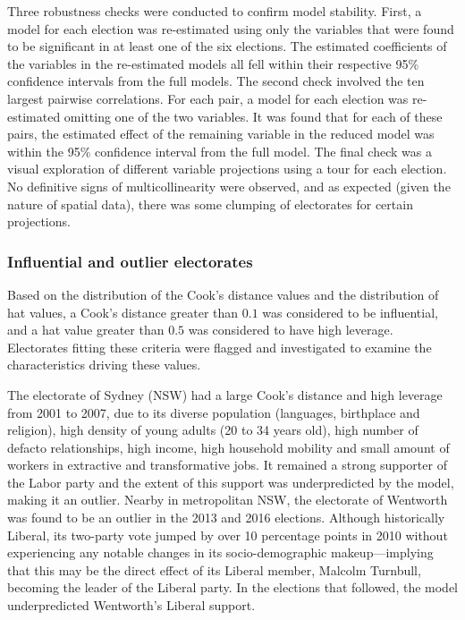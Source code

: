 \documentclass[
  times, doublespace]{anzsauth}
\begin{document}
Three robustness checks were conducted to confirm model stability. First, a model for each election was re-estimated using only the variables that were found to be significant in at least one of the six elections. The estimated coefficients of the variables in the re-estimated models all fell within their respective 95\% confidence intervals from the full models. The second check involved the ten largest pairwise correlations. For each pair, a model for each election was re-estimated omitting one of the two variables. It was found that for each of these pairs, the estimated effect of the remaining variable in the reduced model was within the 95\% confidence interval from the full model. The final check was a visual exploration of different variable projections using a tour \citep{tourr} for each election. No definitive signs of multicollinearity were observed, and as expected (given the nature of spatial data), there was some clumping of electorates for certain projections.

\hypertarget{influential-and-outlier-electorates}{%
\subsubsection*{Influential and outlier electorates}\label{influential-and-outlier-electorates}}

Based on the distribution of the Cook's distance values and the distribution of hat values, a Cook's distance greater than \(0.1\) was considered to be influential, and a hat value greater than \(0.5\) was considered to have high leverage. Electorates fitting these criteria were flagged and investigated to examine the characteristics driving these values.

The electorate of Sydney (NSW) had a large Cook's distance and high leverage from 2001 to 2007, due to its diverse population (languages, birthplace and religion), high density of young adults (20 to 34 years old), high number of defacto relationships, high income, high household mobility and small amount of workers in extractive and transformative jobs. It remained a strong supporter of the Labor party and the extent of this support was underpredicted by the model, making it an outlier. Nearby in metropolitan NSW, the electorate of Wentworth was found to be an outlier in the 2013 and 2016 elections. Although historically Liberal, its two-party vote jumped by over 10 percentage points in 2010 without experiencing any notable changes in its socio-demographic makeup---implying that this may be the direct effect of its Liberal member, Malcolm Turnbull, becoming the leader of the Liberal party. In the elections that followed, the model underpredicted Wentworth's Liberal support.
\end{document}
